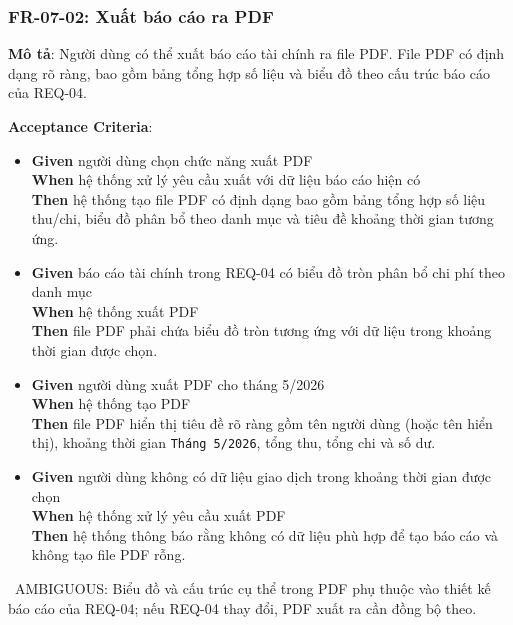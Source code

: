 \subsubsection{FR-07-02: Xuất báo cáo ra PDF}

\textbf{Mô tả}: Người dùng có thể xuất báo cáo tài chính ra file PDF. File PDF có định dạng rõ ràng, bao gồm bảng tổng hợp số liệu và biểu đồ theo cấu trúc báo cáo của REQ-04.



\textbf{Acceptance Criteria}:

\begin{itemize}
\item \textbf{Given} người dùng chọn chức năng xuất PDF  \\ \hspace*{1.5em}  \textbf{When} hệ thống xử lý yêu cầu xuất với dữ liệu báo cáo hiện có  \\ \hspace*{1.5em}  \textbf{Then} hệ thống tạo file PDF có định dạng bao gồm bảng tổng hợp số liệu thu/chi, biểu đồ phân bổ theo danh mục và tiêu đề khoảng thời gian tương ứng.
\item \textbf{Given} báo cáo tài chính trong REQ-04 có biểu đồ tròn phân bổ chi phí theo danh mục  \\ \hspace*{1.5em}  \textbf{When} hệ thống xuất PDF  \\ \hspace*{1.5em}  \textbf{Then} file PDF phải chứa biểu đồ tròn tương ứng với dữ liệu trong khoảng thời gian được chọn.
\item \textbf{Given} người dùng xuất PDF cho tháng 5/2026  \\ \hspace*{1.5em}  \textbf{When} hệ thống tạo PDF  \\ \hspace*{1.5em}  \textbf{Then} file PDF hiển thị tiêu đề rõ ràng gồm tên người dùng (hoặc tên hiển thị), khoảng thời gian \texttt{Tháng 5/2026}, tổng thu, tổng chi và số dư.
\item \textbf{Given} người dùng không có dữ liệu giao dịch trong khoảng thời gian được chọn  \\ \hspace*{1.5em}  \textbf{When} hệ thống xử lý yêu cầu xuất PDF  \\ \hspace*{1.5em}  \textbf{Then} hệ thống thông báo rằng không có dữ liệu phù hợp để tạo báo cáo và không tạo file PDF rỗng.
\end{itemize}
\warningicon\  AMBIGUOUS: Biểu đồ và cấu trúc cụ thể trong PDF phụ thuộc vào thiết kế báo cáo của REQ-04; nếu REQ-04 thay đổi, PDF xuất ra cần đồng bộ theo.



